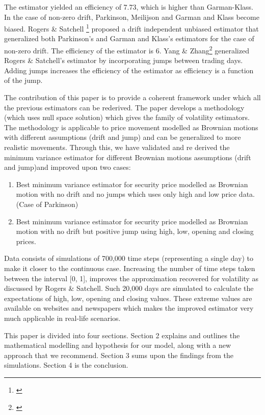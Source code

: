 \documentclass[12pt]{article}   	%
\begin{document}
The estimator yielded an efficiency of 7.73, which is higher than Garman-Klass. 
In the case of non-zero drift, Parkinson, Meilijson and Garman and Klass become biased.
Rogers \& Satchell \footnote{\citealp{rogers1991}} proposed a drift independent unbiased estimator that generalized both Parkinson's and Garman and Klass's estimators for the case of non-zero drift. The efficiency of the estimator is 6.
Yang \& Zhang\footnote{\citealp{yang2000}} generalized Rogers \& Satchell's estimator by incorporating jumps between trading days. Adding jumps increases the efficiency of the estimator as efficiency is a function of the jump.
\par The contribution of this paper is to provide a coherent framework under which all the previous estimators can be rederived. The paper develops a methodology (which uses null space solution) which gives the family of volatility estimators. The methodology is applicable to price movement modelled as Brownian motions with different assumptions (drift and jump) and can be generalized to more realistic movements. Through this, we have validated and re derived the minimum variance estimator for different Brownian motions assumptions (drift and jump)and improved upon two cases:
\begin{enumerate}
\item Best minimum variance estimator for security price modelled as Brownian motion with no drift and no jumps which uses only high and low price data. (Case of Parkinson)
\item Best minimum variance estimator for security price modelled as Brownian motion with no drift but positive jump using high, low, opening and closing prices.
 \end{enumerate}

\par Data consists of simulations of 700,000 time steps (representing a single day) to make it closer to the continuous case. Increasing the number of time steps taken between the interval [0, 1],  improves the approximation recovered for volatility as discussed by Rogers \& Satchell. Such 20,000 days are simulated to calculate the expectations of high, low, opening and closing values. These extreme values are available on websites and newspapers which makes the improved estimator very much applicable in real-life scenarios.
\par This paper is divided into four sections. Section 2 explains and outlines the mathematical modelling and hypothesis for our model, along with a new approach that we recommend. Section 3 sums upon the findings from the simulations. Section 4 is the conclusion. \\
\end{document}
